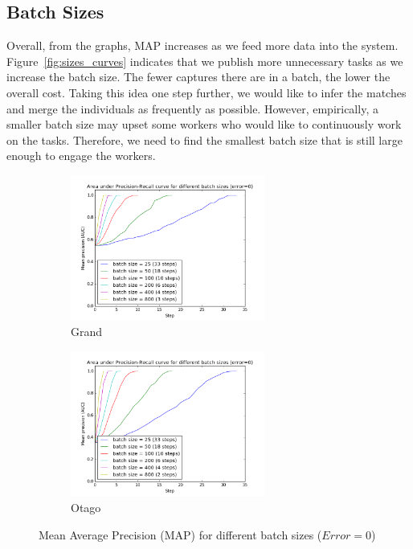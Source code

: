 \subsection{Batch Sizes} %
\label{sub:batch_sizes_res}

Overall, from the graphs, MAP increases as we feed more data into the system.
Figure~\ref{fig:sizes_curves} indicates that we publish more unnecessary
tasks as we increase the batch size. The fewer captures there are in a batch,
the lower the overall cost. Taking this idea one step further, we would like to
infer the matches and merge the individuals as frequently as possible. However,
empirically, a smaller batch size may upset some workers who would like to
continuously work on the tasks. Therefore, we need to find the smallest batch
size that is still large enough to engage the workers.

\begin{figure}[htbp]
  \centering
  \begin{subfigure}[t]{\textwidth}
      \centering
      \includegraphics[width=0.7\textwidth]{sizes/graoc}
      \caption{Grand}
  \end{subfigure}%

    \begin{subfigure}[t]{\textwidth}
      \centering
      \includegraphics[width=0.7\textwidth]{sizes/otaoc}
      \caption{Otago}
  \end{subfigure}%
  \captionsetup{justification=centering}
  \caption{Mean Average Precision (MAP) for different batch sizes ($Error=0$)}
\end{figure}

